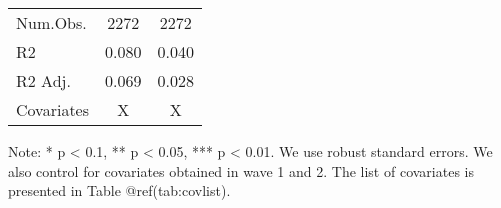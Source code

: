 \begin{table}
\begin{threeparttable}
\begin{tabular}[t]{lcc}
\midrule
Num.Obs. & \num{2272} & \num{2272}\\
R2 & \num{0.080} & \num{0.040}\\
R2 Adj. & \num{0.069} & \num{0.028}\\
Covariates & X & X\\
\bottomrule
\end{tabular}
\begin{tablenotes}
\item Note: * p < 0.1, ** p < 0.05, *** p < 0.01. We use robust standard errors. We also control for covariates obtained in wave 1 and 2. The list of covariates is presented in Table @ref(tab:covlist).
\end{tablenotes}
\end{threeparttable}
\end{table}
